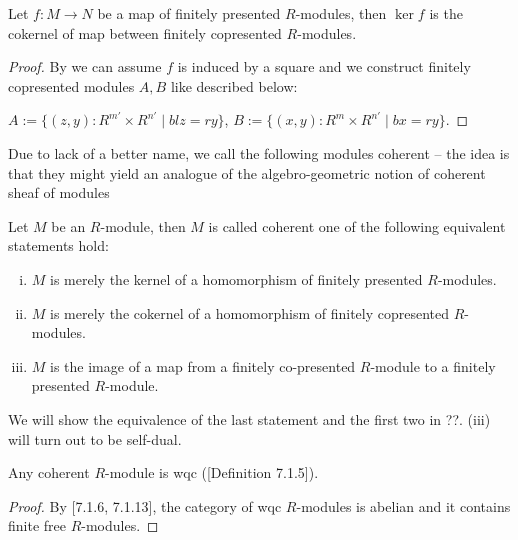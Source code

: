 \begin{lemma}
  \label{kernel-fp-is-cok-fcp}       
  Let $f:M\to N$ be a map of finitely presented $R$-modules, then $\ker f$ is the cokernel of map between finitely copresented $R$-modules.
\end{lemma}

\begin{proof}
  By  we can assume $f$ is induced by a square and we construct finitely copresented modules $A,B$ like described below:
  \begin{center}
   \end{center}
   $A:=\{(z,y):R^{m'}\times R^{n'}\mid blz=ry\}$, $B:=\{(x,y):R^{m}\times R^{n'}\mid bx=ry\}$.
\end{proof}

Due to lack of a better name, we call the following modules coherent --
the idea is that they might yield an analogue of the algebro-geometric notion of coherent sheaf of modules

\begin{definition}
  Let $M$ be an $R$-module, then $M$ is called coherent one of the following equivalent statements hold:
  \begin{enumerate}[(i)]
  \item $M$ is merely the kernel of a homomorphism of finitely presented $R$-modules.
  \item $M$ is merely the cokernel of a homomorphism of finitely copresented $R$-modules.
  \item $M$ is the image of a map from a finitely co-presented $R$-module to a finitely presented $R$-module.
  \end{enumerate}
\end{definition}
We will show the equivalence of the last statement and the first two in ??.
(iii) will turn out to be self-dual.

\begin{remark}
  Any coherent $R$-module is wqc (\cite{draft}[Definition 7.1.5]).
\end{remark}

\begin{proof}
  By \cite{draft}[7.1.6, 7.1.13], the category of wqc $R$-modules is abelian and it contains finite free $R$-modules.
\end{proof}

